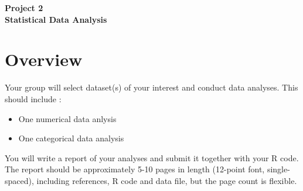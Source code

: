 \documentclass[12pt]{article}
\begin{document}
\begin{center}
\textbf{\Large Project 2 \\  Statistical Data Analysis } 
\end{center}


\section*{Overview}
Your group will select dataset(s) of your interest and conduct data analyses.
This should include :
\begin{itemize}
    \item One numerical data anlysis
    \item One categorical data analysis 
\end{itemize} 
You will write a report of your analyses and submit it together with your R code.
The report should be approximately 5-10 pages in length (12-point font, single-spaced), including references, R code and data file, but the page count is flexible.
\end{document}
